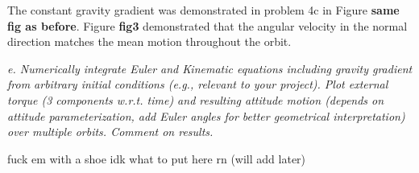 The constant gravity gradient was demonstrated in problem 4c in Figure \textbf{same fig as before}. Figure \textbf{fig3} demonstrated that the angular velocity in the normal direction matches the mean motion throughout the orbit.

\textit{e. Numerically integrate Euler and Kinematic equations including gravity gradient from arbitrary initial conditions (e.g., relevant to your project). Plot external torque (3 components w.r.t. time) and resulting attitude motion (depends on attitude parameterization, add Euler angles for better geometrical interpretation) over multiple orbits. Comment on results.}

fuck em with a shoe idk what to put here rn (will add later)